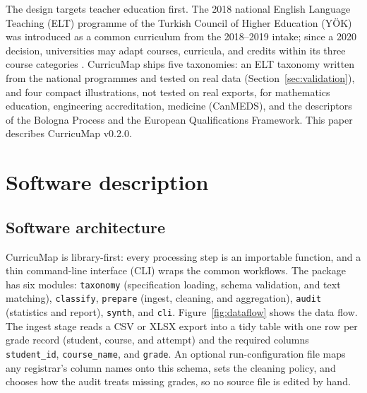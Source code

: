 \documentclass[preprint,12pt,a4paper]{elsarticle}
\begin{document}
The design targets teacher education first. The 2018 national English Language Teaching (ELT) programme of the Turkish Council of Higher Education (Y\"OK) \cite{yok2018} was introduced as a common curriculum from the 2018--2019 intake; since a 2020 decision, universities may adapt courses, curricula, and credits within its three course categories \cite{yok2020}. CurricuMap ships five taxonomies: an ELT taxonomy written from the national programmes and tested on real data (Section~\ref{sec:validation}), and four compact illustrations, not tested on real exports, for mathematics education, engineering accreditation, medicine (CanMEDS), and the descriptors of the Bologna Process and the European Qualifications Framework. This paper describes CurricuMap v0.2.0.

\section{Software description}

\subsection{Software architecture}

CurricuMap is library-first: every processing step is an importable function, and a thin command-line interface (CLI) wraps the common workflows. The package has six modules: \texttt{taxonomy} (specification loading, schema validation, and text matching), \texttt{classify}, \texttt{prepare} (ingest, cleaning, and aggregation), \texttt{audit} (statistics and report), \texttt{synth}, and \texttt{cli}. Figure~\ref{fig:dataflow} shows the data flow. The ingest stage reads a CSV or XLSX export into a tidy table \cite{wickham2014} with one row per grade record (student, course, and attempt) and the required columns \texttt{student\_id}, \texttt{course\_name}, and \texttt{grade}. An optional run-configuration file maps any registrar's column names onto this schema, sets the cleaning policy, and chooses how the audit treats missing grades, so no source file is edited by hand.
\end{document}
